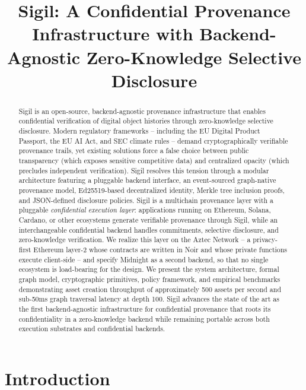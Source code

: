 \documentclass[conference]{IEEEtran}
\title{Sigil: A Confidential Provenance Infrastructure with Backend-Agnostic
       Zero-Knowledge Selective Disclosure}
\author{
  \IEEEauthorblockN{ZKOS Labs}
  \IEEEauthorblockA{%
    \texttt{https://github.com/zkos-labs/sigil}
  }
}
\begin{document}
\maketitle

\begin{abstract}
Sigil is an open-source, backend-agnostic provenance infrastructure that
enables confidential verification of digital object histories through
zero-knowledge selective disclosure. Modern regulatory frameworks -- including
the EU Digital Product Passport, the EU AI Act, and SEC climate rules -- demand
cryptographically verifiable provenance trails, yet existing solutions force a
false choice between public transparency (which exposes sensitive competitive
data) and centralized opacity (which precludes independent verification).  Sigil
resolves this tension through a modular architecture featuring a pluggable
backend interface, an event-sourced graph-native provenance model, Ed25519-based
decentralized identity, Merkle tree inclusion proofs, and JSON-defined
disclosure policies. Sigil is a multichain provenance layer with a pluggable
\emph{confidential execution layer}: applications running on Ethereum, Solana,
Cardano, or other ecosystems generate verifiable provenance through Sigil, while
an interchangeable confidential backend handles commitments, selective
disclosure, and zero-knowledge verification.  We realize this layer on the
Aztec Network -- a privacy-first Ethereum layer-2 whose contracts are written in
Noir and whose private functions execute client-side -- and specify Midnight as
a second backend, so that no single ecosystem is load-bearing for the
design. We present the system architecture, formal graph model,
cryptographic primitives, policy framework, and empirical benchmarks
demonstrating asset creation throughput of approximately 500 assets per second
and sub-50ms graph traversal latency at depth 100. Sigil advances the state of
the art as the first backend-agnostic infrastructure for confidential
provenance that roots its confidentiality in a zero-knowledge backend while
remaining portable across both execution substrates and confidential backends.
\end{abstract}


\section{Introduction}
\end{document}
